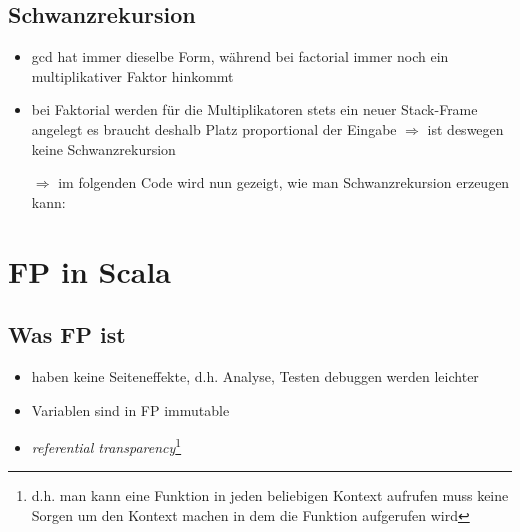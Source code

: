 \subsection{Schwanzrekursion}






\begin{itemize}
  \item gcd hat immer dieselbe Form, während bei factorial immer noch ein
  multiplikativer Faktor hinkommt
  \item bei Faktorial werden für die Multiplikatoren stets ein neuer
  Stack-Frame angelegt \und es braucht deshalb Platz proportional der
  Eingabe $\Rightarrow$ ist deswegen keine Schwanzrekursion
  
  $\Rightarrow$ im folgenden Code wird nun gezeigt, wie man Schwanzrekursion
  erzeugen kann:
  
  
\end{itemize}
\pagebreak


\section{FP in Scala}


\subsection{Was FP ist}
\begin{itemize}
  \item haben keine Seiteneffekte, d.h. Analyse, Testen \und debuggen
  werden leichter
  \item Variablen sind in FP immutable
  \item \textit{referential transparency}\footnote{d.h. man kann eine
  Funktion in jeden beliebigen Kontext aufrufen \und muss keine Sorgen 
  um den Kontext machen in dem die Funktion aufgerufen wird}
\end{itemize}


